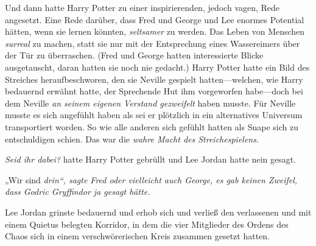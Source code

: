 Und dann hatte Harry Potter zu einer inspirierenden, jedoch vagen, Rede angesetzt. Eine Rede darüber, dass Fred und George und Lee enormes Potential hätten, wenn sie lernen könnten, \emph{seltsamer} zu werden. Das Leben von Menschen \emph{surreal} zu machen, statt sie nur mit der Entsprechung eines Wassereimers über der Tür zu überraschen. (Fred und George hatten interessierte Blicke ausgetauscht, daran hatten sie noch nie gedacht.) Harry Potter hatte ein Bild des Streiches heraufbeschworen, den sie Neville gespielt hatten—welchen, wie Harry bedauernd erwähnt hatte, der Sprechende Hut ihm vorgeworfen habe—doch bei dem Neville \emph{an seinem eigenen Verstand gezweifelt} haben musste. Für Neville musste es sich angefühlt haben als sei er plötzlich in ein alternatives Universum transportiert worden. So wie alle anderen sich gefühlt hatten als Snape sich zu entschuldigen schien. Das war die \emph{wahre Macht des Streichespielens.}

\emph{Seid ihr dabei?} hatte Harry Potter gebrüllt und Lee Jordan hatte nein gesagt.

„Wir sind \emph{drin“, sagte Fred oder vielleicht auch George, es gab keinen Zweifel, dass Godric Gryffindor ja gesagt hätte.}

Lee Jordan grinste bedauernd und erhob sich und verließ den verlassenen und mit einem Quietus belegten Korridor, in dem die vier Mitglieder des Ordens des Chaos sich in einem verschwörerischen Kreis zusammen gesetzt hatten.

